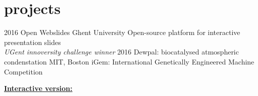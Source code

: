 \documentclass[]{friggeri-cv}
\begin{document}

\vspace{0.5cm} \section{projects}
\begin{entrylist}
 \entry
 {2016}
 {Open Webslides}
 {Ghent University}
 {Open-source platform for interactive presentation slides \\ \emph{UGent innoversity challenge winner}}
 \entry
 {2016}
 {Dewpal: biocatalysed atmospheric condenstation}
 {MIT, Boston}
 {iGem: International Genetically Engineered Machine \\Competition}
\end{entrylist}

{\hspace{-6cm} \href{http://bramdejaegher.be/CV.html}{\textbf{Interactive version:} }\\ \\}
\end{document}

